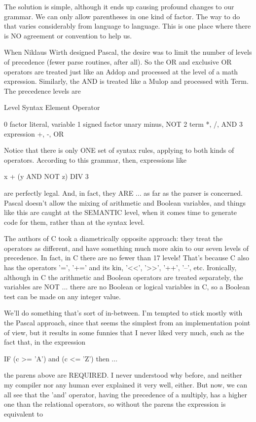 \documentclass[float=false, crop=false]{standalone}
\begin{document}
The solution is simple, although it ends up causing profound changes to our
grammar. We can only allow parentheses in one kind of factor. The way to do that
varies considerably from language to language. This is one place where there is
NO agreement or convention to help us.

When Niklaus Wirth designed Pascal, the desire was to limit the number of levels
of precedence (fewer parse routines, after all). So the OR and exclusive OR
operators are treated just like an Addop and processed at the level of a math
expression. Similarly, the AND is treated like a Mulop and processed with Term.
The precedence levels are


          Level   Syntax Element     Operator

          0       factor             literal, variable
          1       signed factor      unary minus, NOT
          2       term               *, /, AND
          3       expression         +, -, OR


Notice that there is only ONE set of syntax rules, applying to both kinds of
operators. According to this grammar, then, expressions like

     x + (y AND NOT z) DIV 3

are perfectly legal. And, in fact, they ARE ... as far as the parser is
concerned. Pascal doesn't allow the mixing of arithmetic and Boolean variables,
and things like this are caught at the SEMANTIC level, when it comes time to
generate code for them, rather than at the syntax level.

The authors of C took a diametrically opposite approach: they treat the
operators as different, and have something much more akin to our seven levels of
precedence. In fact, in C there are no fewer than 17 levels! That's because C
also has the operators '=', '+=' and its kin, '<<', '>>', '++', '--', etc.
Ironically, although in C the arithmetic and Boolean operators are treated
separately, the variables are NOT ... there are no Boolean or logical variables
in C, so a Boolean test can be made on any integer value.

We'll do something that's sort of in-between. I'm tempted to stick mostly with
the Pascal approach, since that seems the simplest from an implementation point
of view, but it results in some funnies that I never liked very much, such as
the fact that, in the expression

     IF (c >= 'A') and (c <= 'Z') then ...

the parens above are REQUIRED. I never understood why before, and neither my
compiler nor any human ever explained it very well, either. But now, we can all
see that the 'and' operator, having the precedence of a multiply, has a higher
one than the relational operators, so without the parens the expression is
equivalent to
\end{document}
